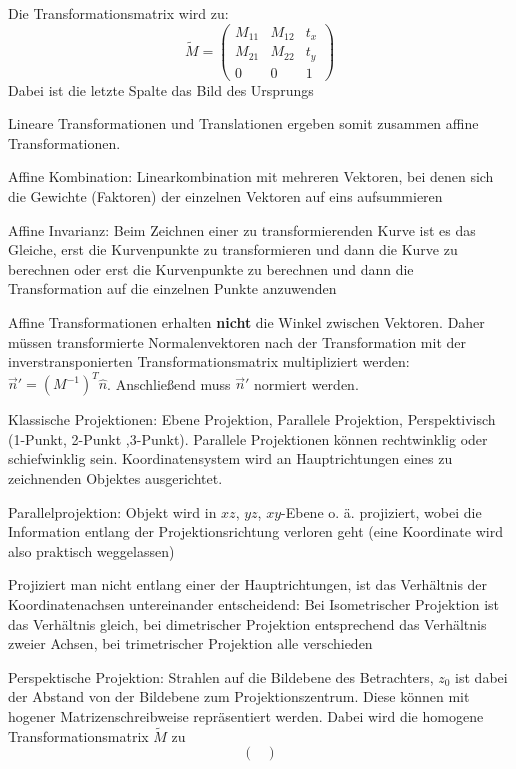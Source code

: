 \documentclass[12pt,landscape]{article}
\begin{document}
\begin{multicols}{3}
\begin{compactitem}
Die Transformationsmatrix wird zu:
\[
\tilde{M} = \begin{pmatrix}
M_{11} & M_{12} & t_x \\
M_{21} & M_{22} & t_y \\
0 & 0 & 1
\end{pmatrix}
\]
Dabei ist die letzte Spalte das Bild des Ursprungs
\item Lineare Transformationen und Translationen ergeben somit zusammen affine Transformationen.
\item Affine Kombination: Linearkombination mit mehreren Vektoren, bei denen sich die Gewichte (Faktoren) der einzelnen Vektoren auf eins aufsummieren
\item Affine Invarianz: Beim Zeichnen einer zu transformierenden Kurve ist es das Gleiche, erst die Kurvenpunkte zu transformieren und dann die Kurve zu berechnen oder erst die Kurvenpunkte zu berechnen und dann die Transformation auf die einzelnen Punkte anzuwenden
\item Affine Transformationen erhalten \textbf{nicht} die Winkel zwischen Vektoren. Daher müssen transformierte Normalenvektoren nach der Transformation mit der inverstransponierten Transformationsmatrix multipliziert werden: $\vec{n}' = (M^{-1})^T \hat{n}$. Anschließend muss $\vec{n}'$ normiert werden.
\item Klassische Projektionen: Ebene Projektion, Parallele Projektion, Perspektivisch (1-Punkt, 2-Punkt ,3-Punkt). Parallele Projektionen können rechtwinklig oder schiefwinklig sein. Koordinatensystem wird an Hauptrichtungen eines zu zeichnenden Objektes ausgerichtet.
\item Parallelprojektion: Objekt wird in $xz$, $yz$, $xy$-Ebene o. ä. projiziert, wobei die Information entlang der Projektionsrichtung verloren geht (eine Koordinate wird also praktisch weggelassen)
\item Projiziert man nicht entlang einer der Hauptrichtungen, ist das Verhältnis der Koordinatenachsen untereinander entscheidend: Bei Isometrischer Projektion ist das Verhältnis gleich, bei dimetrischer Projektion entsprechend das Verhältnis zweier Achsen, bei trimetrischer Projektion alle verschieden
\item Perspektische Projektion: Strahlen auf die Bildebene des Betrachters, $z_0$ ist dabei der Abstand von der Bildebene zum Projektionszentrum. Diese können mit hogener Matrizenschreibweise repräsentiert werden. Dabei wird die homogene Transformationsmatrix $\tilde{M}$ zu \[
\begin{pmatrix}

\end{pmatrix}\]
\end{compactitem}
\end{multicols}
\end{document}
